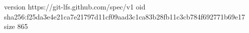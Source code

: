 version https://git-lfs.github.com/spec/v1
oid sha256:f25da3e4e21ca7e21797d11cf09aad3c1ca83b28fb11c3cb784f692771b69e17
size 865
